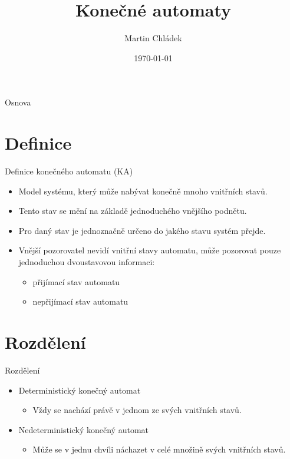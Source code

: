 \documentclass[hyperref={unicode}]{beamer}
\author{\Large{Martin Chládek}}
\title{\Huge{Konečné automaty}}
\institute{\small{Vysoké učení technické\\Fakulta informačních technologií}}
\date{\today}
\begin{document}
\watermarkoff

\begin{frame}[t,plain]
\maketitle
\end{frame}

\begin{frame}{Osnova}
\begin{minipage}{\textwidth}
       \tableofcontents
    \end{minipage}
\end{frame}

\section{Definice}
\begin{frame}[t]{Definice konečného automatu (KA)}
\begin{itemize}
    \item Model systému, který může nabývat konečně mnoho vnitřních stavů.
    \item Tento stav se mění na základě jednoduchého vnějšího podnětu.
    \item Pro daný stav je jednoznačně určeno do jakého stavu systém přejde.
    \item Vnější pozorovatel nevidí vnitřní stavy automatu, může pozorovat pouze jednoduchou dvoustavovou informaci:
    \begin{itemize}
        \setlength\itemsep{0.7em}
        \item přijímací stav automatu
        \item nepřijímací stav automatu
    \end{itemize}
\end{itemize}
\end{frame}

\section{Rozdělení}
\begin{frame}[t]{Rozdělení}
\begin{itemize}
    \setlength\itemsep{1em}
    \item Deterministický konečný automat
    \begin{itemize}
        \item Vždy se nachází právě v jednom ze svých vnitřních stavů.
    \end{itemize}
    \item Nedeterministický konečný automat
    \begin{itemize}
        \item Může se v jednu chvíli náchazet v celé množině svých vnitřních stavů.
    \end{itemize}
\end{itemize}
\end{frame}
\end{document}
